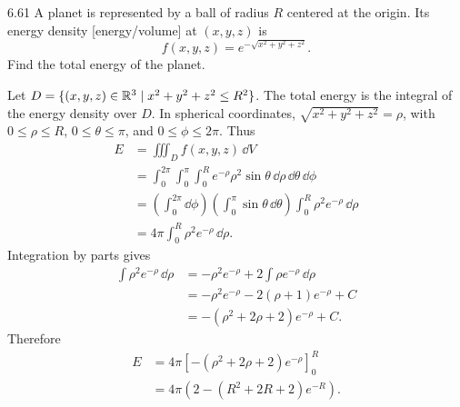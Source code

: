 \documentclass[11pt,oneside]{article}
\begin{document}
\begin{problem}{6.61}
A planet is represented by a ball of radius $R$ centered at the origin.
Its energy density [energy/volume] at $(x, y, z)$ is
\[
    f(x, y, z)=e^{-\sqrt{x^2+y^2+z^2}}.
\]
Find the total energy of the planet.
\end{problem}
\begin{solution}
Let $D=\{(x, y, z)\in\mathbb{R}^3\mid x^2+y^2+z^2\le R^2\}$.
The total energy is the integral of the energy density over $D$.
In spherical coordinates, $\sqrt{x^2+y^2+z^2}=\rho$, with
$0\le\rho\le R$, $0\le\theta\le\pi$, and $0\le\phi\le2\pi$.
Thus
\[
\begin{aligned}
    E
    &=\iiint_D f(x, y, z)\,\dd V\\
    &=\int_0^{2\pi}\int_0^\pi\int_0^R
      e^{-\rho}\rho^2\sin\theta\,\dd\rho\,\dd\theta\,\dd\phi\\
    &=\left(\int_0^{2\pi}\dd\phi\right)
      \left(\int_0^\pi\sin\theta\,\dd\theta\right)
      \int_0^R\rho^2e^{-\rho}\,\dd\rho\\
    &=4\pi\int_0^R\rho^2e^{-\rho}\,\dd\rho.
\end{aligned}
\]
Integration by parts gives
\[
\begin{aligned}
    \int\rho^2e^{-\rho}\,\dd\rho
    &=-\rho^2e^{-\rho}+2\int\rho e^{-\rho}\,\dd\rho\\
    &=-\rho^2e^{-\rho}-2(\rho+1)e^{-\rho}+C\\
    &=-(\rho^2+2\rho+2)e^{-\rho}+C.
\end{aligned}
\]
Therefore
\[
\begin{aligned}
    E
    &=4\pi\left[-(\rho^2+2\rho+2)e^{-\rho}\right]_0^R\\
    &=\boxed{4\pi\left(2-(R^2+2R+2)e^{-R}\right)}.
\end{aligned}
\]
\end{solution}
\end{document}
